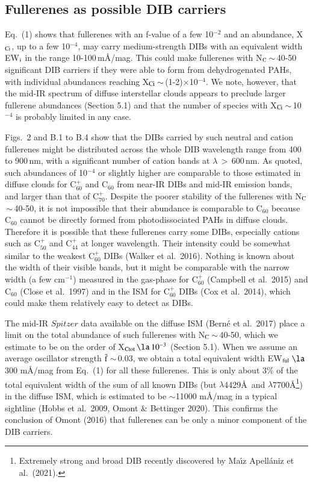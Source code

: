 \documentclass{aa}
\begin{document}
\subsection{Fullerenes as possible DIB carriers}

Eq.\ (1) shows  that fullerenes with an f-value of a few 10$^{-2}$ and an abundance, X$_{\rm Ci}$, up to a few 10$^{-4}$,  may carry medium-strength DIBs with an equivalent width EW$_{\rm i}$ in the range 10-100\,m\AA /mag. This could make fullerenes with N$_{\rm C}$\,$\sim$\,40-50 significant DIB 
carriers if they were able to form from dehydrogenated PAHs, with individual abundances reaching X$_{\rm Ci}$\,$\sim$\,(1-2)$\times$10$^{-4}$. We note, however, that the mid-IR spectrum of diffuse interstellar clouds appears to preclude larger fullerene abundances (Section 5.1) and that the number of species with X$_{\rm Ci}$\,$\sim$\,10$^{-4}$ is probably limited in any case.

Figs.\ 2 and B.1 to B.4 show that the DIBs carried by such neutral and cation fullerenes might be distributed across the whole DIB wavelength range from 400 to 900\,nm, with a significant number of cation bands at $\lambda$\,$>$\,600\,nm.
As quoted, such abundances of 10$^{-4}$ or slightly higher are comparable to those estimated in diffuse clouds for C$_{60}^+$ and C$_{60}$ from near-IR DIBs and mid-IR emission bands, and larger than that of C$_{70}^+$. Despite the poorer stability of the fullerenes with N$_{\rm C}$\,$\sim$\,40-50, it is not impossible that their abundance is comparable to C$_{60}$ 
because C$_{60}$ 
cannot be directly formed from photodissociated PAHs in diffuse clouds. Therefore it is possible that these fullerenes carry some DIBs, especially cations such as C$_{50}^+$ and C$_{44}^+$ at longer wavelength. Their intensity could be somewhat similar to the weakest C$_{60}^+$ DIBs (Walker 
et al.\ 2016). Nothing is known about the width of their visible bands, but it might be comparable with the narrow width (a few cm$^{-1}$) measured in the gas-phase for C$_{60}^+$ (Campbell et al.\ 2015) and C$_{60}$ (Close et al.\ 1997) and in the ISM for C$_{60}^+$ DIBs (Cox et al.\ 2014), which could make them relatively easy to detect as DIBs. 

The mid-IR $Spitzer$ data available on the diffuse ISM (Bern\'e et al.\ 2017) place a limit on the total abundance of such fullerenes with N$_{\rm C}$\,$\sim$\,40-50, which we estimate to be on the order of X$_{\rm Ctot}\,\la\,10^{-3}$ (Section 5.1). When we assume an average oscillator strength  ${\rm \bar{f}}$\,$\sim$\,0.03, we obtain a total equivalent width EW$_{\rm ful}$\,$\la$\,300 m\AA /mag from Eq.\ (1) for all these fullerenes. This is only about 3\% of the total equivalent width of the sum of all known DIBs (but $\lambda$4429\AA\ and $\lambda$7700\AA \footnote{Extremely strong and broad DIB recently discovered by  Ma{\'\i}z Apell{\'a}niz et al.\ (2021).}) in the diffuse ISM, which is estimated to be $\sim$11000 m\AA /mag in a typical sightline (Hobbs et al.\ 2009, Omont \& Bettinger 2020). This confirms the conclusion of Omont (2016) that fullerenes can be only a minor component of the DIB carriers. 
\end{document}
